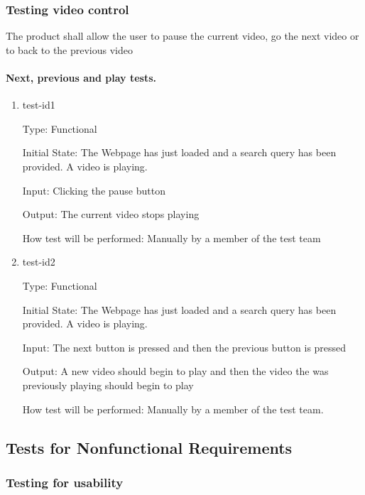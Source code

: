 \documentclass[12pt, titlepage]{article}
\begin{document}
\subsubsection{Testing video control}

The product shall allow the user to pause the current video, go the next video or to back to the previous video

\paragraph{Next, previous and play tests.}

\begin{enumerate}

\item{test-id1\\}

Type: Functional
					
Initial State: The Webpage has just loaded and a search query has been provided.  A video is playing.
					
Input: Clicking the pause button
					
Output: The current video stops playing
					
How test will be performed: Manually by a member of the test team
					
\item{test-id2\\}

Type: Functional
					
Initial State: The Webpage has just loaded and a search query has been provided.  A video is playing.
					
Input: The next button is pressed and then the previous button is pressed
					
Output: A new video should begin to play and then the video the was previously playing should begin to play
					
How test will be performed: Manually by a member of the test team.

\end{enumerate}

\subsection{Tests for Nonfunctional Requirements}

\subsubsection{Testing for usability}
\end{document}
